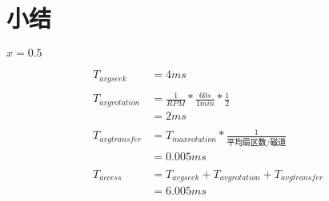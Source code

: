 
\section{小结}
{
    \begin{practicec}
        $x = 0.5$
    \end{practicec}

    \begin{practicec}
        \begin{align*}
            T_{avg seek} &= 4ms \\
            \\
            T_{avg rotation} &= \frac{1}{RPM} * \frac{60s}{1min} * \frac{1}{2} \\
            &= 2ms \\
            \\
            T_{avg transfer} &= T_{max rotation} * \frac{1}{\text{平均扇区数/磁道}} \\
            &= 0.005ms \\
            \\
            T_{access}
            &= T_{avg seek} + T_{avg rotation} + T_{avg transfer} \\
            &= 6.005ms
        \end{align*}
    \end{practicec}
}

